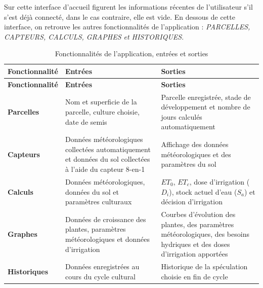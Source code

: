 Sur cette interface d'accueil figurent les informations récentes de l’utilisateur s’il s’est déjà connecté, dans le cas contraire, elle est vide. En dessous de cette interface, on retrouve les autres fonctionnalités de l'application : \textit{PARCELLES, CAPTEURS, CALCULS, GRAPHES et HISTORIQUES}.

{\small
\begin{longtable}{|p{2.6cm}|p{5.7cm}|p{5.7cm}|}
    \caption{Fonctionnalités de l'application, entrées et sorties}
    \label{tab:fonctionnalites_appli} \\
    \hline
    \textbf{Fonctionnalité} & \textbf{Entrées} & \textbf{Sorties} \\
    \hline
    \endfirsthead
    \hline
    \textbf{Fonctionnalité} & \textbf{Entrées} & \textbf{Sorties} \\
    \hline
    \endhead
    \textbf{Parcelles} & Nom et superficie de la parcelle, culture choisie, date de semis & Parcelle enregistrée, stade de développement et nombre de jours calculés automatiquement \\
    \hline
    \textbf{Capteurs} & Données météorologiques collectées automatiquement et données du sol collectées à l'aide du capteur 8-en-1 & Affichage des données météorologiques et des paramètres du sol \\
    \hline
    \textbf{Calculs} & Données météorologiques, données du sol et paramètres culturaux & $ET_0$, $ET_c$, dose d'irrigation ($D_i$), stock actuel d'eau ($S_a$) et décision d'irrigation \\
    \hline
    \textbf{Graphes} & Données de croissance des plantes, paramètres météorologiques et données d'irrigation & Courbes d'évolution des plantes, des paramètres météorologiques, des besoins hydriques et des doses d'irrigation apportées \\
    \hline
    \textbf{Historiques} & Données enregistrées au cours du cycle cultural & Historique de la spéculation choisie en fin de cycle \\
    \hline
\end{longtable}
}